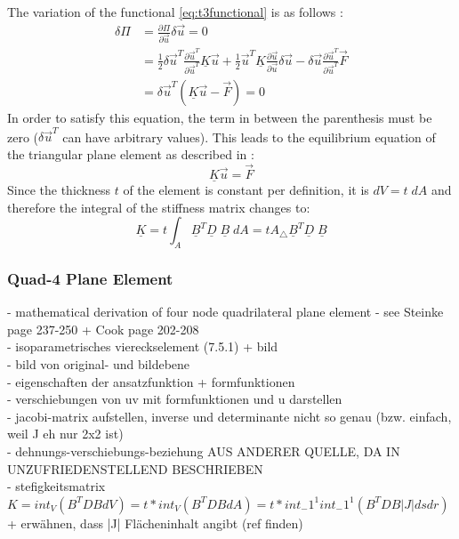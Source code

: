   The variation of the functional \ref{eq:t3functional} is as follows \cite{steinke2005finite}:
  \begin{align}
  \delta\Pi &= \frac{\partial\Pi}{\partial \vec{u}}\delta\vec{u} = 0 \nonumber\\
            &= \frac{1}{2}\delta\vec{u}^T\frac{\partial\vec{u}^T}{\partial\vec{u}^T}\underline{K}\vec{u} + \frac{1}{2}\vec{u}^T\underline{K}\frac{\partial\vec{u}}{\partial\vec{u}}\delta\vec{u} - \delta\vec{u}\frac{\partial\vec{u}^T}{\partial\vec{u}^T}\vec{F} \nonumber\\
            &= \delta\vec{u}^T\left(\underline{K}\vec{u}-\vec{F}\right) = 0
  \end{align}
  In order to satisfy this equation, the term in between the parenthesis must be zero ($\delta\vec{u}^T$ can have arbitrary values). This leads to the equilibrium equation of the triangular plane element as described in \cite{steinke2005finite}:
  \begin{equation}
  \underline{K}\vec{u} = \vec{F}
  \end{equation}
  Since the thickness $t$ of the element is constant per definition, it is $dV = t\;dA$ and therefore the integral of the stiffness matrix changes to:
  \begin{equation}
  \underline{K} = t \int_A \underline{B}^T\underline{D}\;\underline{B}\;dA = t A_\triangle \underline{B}^T\underline{D}\;\underline{B}
  \end{equation}
  \subsubsection{Quad-4 Plane Element}
  - mathematical derivation of four node quadrilateral plane element\newline
  - see Steinke \cite{steinke2005finite} page 237-250 + Cook \cite{cook2002concepts} page 202-208\\
  - isoparametrisches viereckselement (7.5.1) + bild\\
  - bild von original- und bildebene\\
  - eigenschaften der ansatzfunktion + formfunktionen\\
  - verschiebungen von uv mit formfunktionen und u darstellen\\
  - jacobi-matrix aufstellen, inverse und determinante nicht so genau (bzw. einfach, weil J eh nur 2x2 ist)\\
  - dehnungs-verschiebungs-beziehung AUS ANDERER QUELLE, DA IN \cite{steinke2005finite} UNZUFRIEDENSTELLEND BESCHRIEBEN\\
  - stefigkeitsmatrix $K = int_V(B^TDBdV) = t*int_V(B^TDBdA) = t*int_-1^1 int_-1^1(B^TDB|J|dsdr)$ + erwähnen, dass |J| Flächeninhalt angibt (ref finden)
